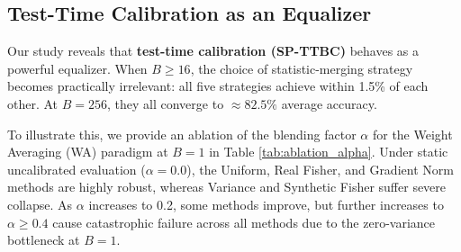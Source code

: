 \documentclass{article}
\theoremstyle{plain}
\theoremstyle{definition}
\theoremstyle{remark}
\begin{document}
\begin{table}[h]
\caption{Average accuracy under static evaluation ($\alpha=0.0$) and blended evaluation ($\alpha=0.8$) across different temperatures $T$ under Task Arithmetic ($\lambda=0.70$).}
\label{tab:temperature_sweep}
\begin{center}
\begin{small}
\end{small}
\end{center}
\end{table}

\subsection{Test-Time Calibration as an Equalizer}
Our study reveals that \textbf{test-time calibration (SP-TTBC)} behaves as a powerful equalizer. When $B \ge 16$, the choice of statistic-merging strategy becomes practically irrelevant: all five strategies achieve within 1.5\% of each other. At $B=256$, they all converge to $\approx 82.5\%$ average accuracy. 

To illustrate this, we provide an ablation of the blending factor $\alpha$ for the Weight Averaging (WA) paradigm at $B=1$ in Table \ref{tab:ablation_alpha}. Under static uncalibrated evaluation ($\alpha=0.0$), the Uniform, Real Fisher, and Gradient Norm methods are highly robust, whereas Variance and Synthetic Fisher suffer severe collapse. As $\alpha$ increases to 0.2, some methods improve, but further increases to $\alpha \ge 0.4$ cause catastrophic failure across all methods due to the zero-variance bottleneck at $B=1$.
\end{document}
